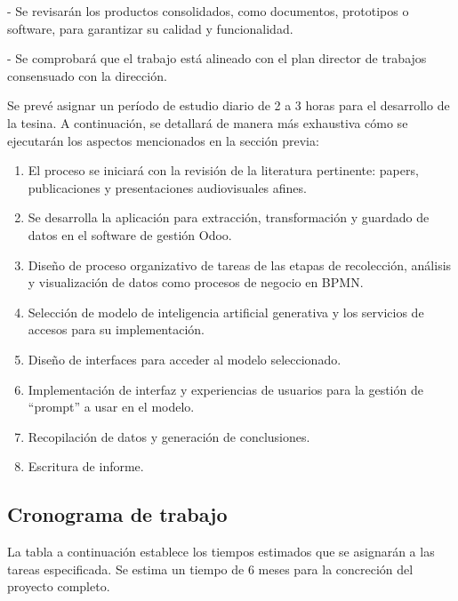 \documentclass[12pt]{article}
\begin{document}
- Se revisarán los productos consolidados, como documentos, prototipos o software, para garantizar su calidad y funcionalidad.

- Se comprobará que el trabajo está alineado con el plan director de trabajos consensuado con la dirección.


\vspace{1cm}

Se prevé asignar un período de estudio diario de 2 a 3 horas para el desarrollo de la tesina. A continuación, se detallará de manera más exhaustiva cómo se ejecutarán los aspectos mencionados en la sección previa:

\begin{enumerate}
    \item El proceso se iniciará con la revisión de la literatura pertinente: papers, publicaciones y presentaciones audiovisuales afines.
    \item Se desarrolla la aplicación para extracción, transformación y guardado de datos en el software de gestión Odoo.
    \item Diseño de proceso organizativo de tareas de las etapas de recolección, análisis y visualización de datos como procesos de negocio en BPMN.
    \item Selección de modelo de inteligencia artificial generativa y los servicios de accesos para su implementación.
    \item Diseño de interfaces para acceder al modelo seleccionado.
    \item Implementación de interfaz y experiencias de usuarios para la gestión de ``prompt'' a usar en el modelo.
    \item Recopilación de datos y generación de conclusiones.
    \item Escritura de informe.
\end{enumerate}


\subsection{Cronograma de trabajo}

La tabla a continuación establece los tiempos estimados que se asignarán a las tareas especificada.
Se estima un tiempo de 6 meses para la concreción del proyecto completo.
\end{document}
